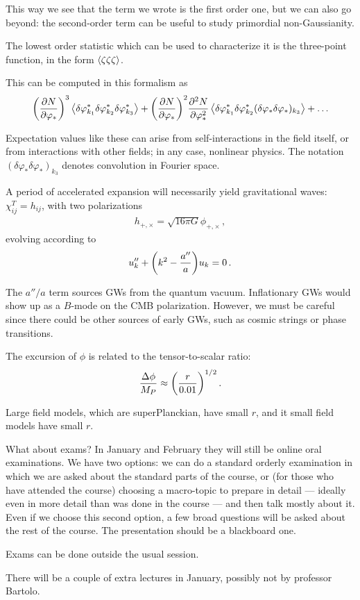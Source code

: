 \documentclass[main.tex]{subfiles}
\begin{document}
This way we see that the term we wrote is the first order one, but we can also go beyond: the second-order term can be useful to study primordial non-Gaussianity. 

The lowest order statistic which can be used to characterize it is the three-point function, in the form \(\expval{\zeta \zeta \zeta }\). 

This can be computed in this formalism as 
%
\begin{align}
\qty(\pdv{N}{\varphi _*})^3 \expval{ \delta \varphi _{k_1 }^{*}\delta \varphi _{k_2 }^{*}\delta \varphi _{k_3 }^{*}} 
+ 
\qty(\pdv{N}{\varphi _*})^2 \pdv[2]{N}{\varphi _*}
\expval{
    \delta \varphi ^*_{k_1 }
    \delta \varphi ^*_{k_2 }
    (\delta \varphi _* \delta \varphi _*)_{k_3 }
} + \dots
\end{align}

Expectation values like these can arise from self-interactions in the field itself, or from interactions with other fields; in any case, nonlinear physics.
The notation \((\delta \varphi _* \delta \varphi _*)_{k_3 }\) denotes convolution in Fourier space.

A period of accelerated expansion will necessarily yield gravitational waves: \(\chi_{ij}^{T} = h_{ij}\), with two polarizations 
%
\begin{align}
h_{+, \times} = \sqrt{16 \pi G } \phi_{+, \times }
\,,
\end{align}
%
evolving according to 
%
\begin{align}
u_k'' + \qty(k^2 - \frac{a''}{a}) u_k = 0
\,.
\end{align}

The \(a'' / a\) term sources GWs from the quantum vacuum. 
Inflationary GWs would show up as a \(B\)-mode on the CMB polarization. 
However, we must be careful since there could be other sources of early GWs, such as cosmic strings or phase transitions. 

The excursion of \(\phi \) is related to the tensor-to-scalar ratio: 
%
\begin{align}
\frac{\Delta \phi }{M_P} \approx \qty( \frac{r}{\num{.01}})^{1/2}
\,.
\end{align}

Large field models, which are superPlanckian, have small \(r\), and it small field models have small \(r\). 


What about exams? In January and February they will still be online oral examinations.
We have two options: we can do a standard orderly examination in which we are asked about the standard parts of the course, or (for those who have attended the course) choosing a macro-topic to prepare in detail --- ideally even in more detail than was done in the course --- and then talk mostly about it. Even if we choose this second option, a few broad questions will be asked about the rest of the course. 
The presentation should be a blackboard one.

Exams can be done outside the usual session. 

There will be a couple of extra lectures in January, possibly not by professor Bartolo. 
\end{document}

